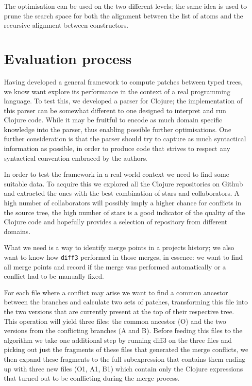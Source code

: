 \documentclass[11pt]{article}
\begin{document}
The optimisation can be used on the two different levels; the same idea is used to prune the search space 
for both the alignment between the list of atoms and the recursive alignment between constructors.


\section{Evaluation process}

Having developed a general framework to compute patches between typed trees, 
we know want explore its performance in the context of a real programming language.
To test this, we developed a parser for Clojure; the implementation of this parser can be somewhat 
different to one designed to interpret and run Clojure code. While it may 
be fruitful to encode as much domain specific knowledge into the parser, thus 
enabling possible further optimisations. One further consideration is that the parser should try to 
capture as much syntactical information as possible, in order to produce code 
that strives to respect any syntactical convention embraced by the authors.

In order to test the framework in a real world context we need to find some suitable data. To acquire this 
we explored all the Clojure repositories on Github and extracted the ones with the best combination of 
stars and collaborators. A high number of collaborators will possibly imply a higher chance for conflicts in
the source tree, the high number of stars is a good indicator of the quality of 
the Clojure code and hopefully provides a selection of repository from different 
domains.

What we need is a way to identify merge points in a projects history; we also 
want to know how \texttt{diff3} performed in those merges, in essence: we want to find all 
merge points and record if the merge was performed automatically or a conflict 
had to be manually fixed.

For each file where a conflict may arise we want to find a common ancestor 
between the branches and calculate two sets of patches, transforming this file 
into the two versions that are currently present at the top of their respective 
tree. This operation will yield three files: the common ancestor (O) and the two 
versions from the conflicting branches (A and B). Before feeding this files to 
the algorithm we take one additional step by running diff3 on the three files 
and picking out just the fragments of these files that generated the merge 
conflicts, we then expand these fragments to the full subexpression that 
contains them ending up with three new files (O1, A1, B1) which contain only the 
Clojure expressions that turned out to be conflicting during the merge process.
\end{document}
